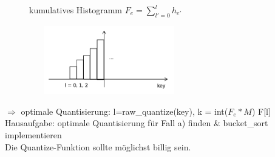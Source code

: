 \begin {enumerate}
        \begin{figure}[htbp]
            \begin{minipage}[t]{10cm}
                \centering
                \vspace{-1cm}
                kumulatives Histogramm $F_e = \sum_{l' = 0}^{l} h_{e'}$ \\
            \end{minipage}
            \begin{minipage}[t]{6cm}
                \hspace*{-1cm}\includegraphics[width=7cm,height=3cm,keepaspectratio]{./Pictures/Balken2.png}\\
            \end{minipage}
        \end{figure}


        $\Rightarrow$ optimale Quantisierung: \hspace*{5mm} l=raw\_quantize(key),
        k = int($F_e * M$)\hspace*{5mm}  F[l] \\

        Hausaufgabe: optimale Quantisierung für Fall a) finden \& bucket\_sort implementieren \\
        Die Quantize-Funktion sollte möglichst billig sein.
\end{enumerate}

